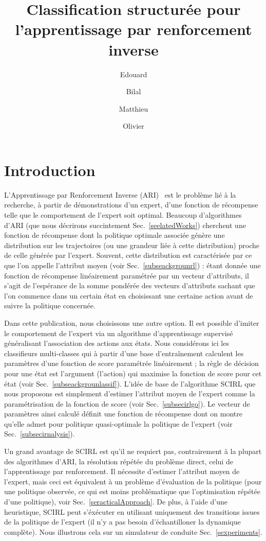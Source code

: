 \documentclass[french,utf8]{./hermes-journal}
\title[SCIRL]{Classification structurée pour l'apprentissage par renforcement inverse}
\author[1,2]{Edouard}{Klein}
\author[2,3]{Bilal}{Piot}
\author[2]{Matthieu}{Geist}
\author[2,3]{Olivier}{Pietquin}
\begin{document}
\maketitle

\newpage
\section{Introduction}
\label{sentro}

L'Apprentissage par Renforcement Inverse (ARI)~\cite{Russel998} est le problème lié à la recherche, à partir de démonstrations d'un expert, d'une fonction de récompense telle que le comportement de l'expert soit optimal. Beaucoup d'algorithmes d'ARI (que nous décrirons succintement Sec.~\ref{seelatedWorks}) cherchent une fonction de récompense dont la politique optimale associée génère une distribution sur les trajectoires (ou une grandeur liée à cette distribution) proche de celle générée par l'expert. Souvent, cette distribution est caractérisée par ce que l'on appelle l'attribut moyen (voir Sec.~\ref{subseackgrounrl}) : étant donnée une fonction de récompense linéairement paramétrée par un vecteur d'attributs, il s'agit de l'espérance de la somme pondérée des vecteurs d'attributs sachant que l'on commence dans un certain état en choisissant une certaine action avant de suivre la politique concernée.

Dans cette publication, nous choisissons une autre option. Il est possible d'imiter le comportement de l'expert via un algorithme d'apprentissage supervisé généralisant l'association des actions aux états. Nous considérons ici les classifieurs multi-classes qui à partir d'une base d'entraînement calculent les paramètres d'une fonction de score paramétrée linéairement ; la règle de décision pour une état est l'argument (l'action) qui maximise la fonction de score pour cet état (voir Sec.~\ref{subseackgrounlassif}). L'idée de base de l'algorithme SCIRL que nous proposons est simplement d'estimer l'attribut moyen de l'expert comme la paramétrisation de la fonction de score (voir Sec.~\ref{subsecirlgo}). Le vecteur de paramètres ainsi calculé définit une fonction de récompense dont on montre qu'elle admet pour politique quasi-optimale la politique de l'expert (voir Sec.~\ref{subsecirnalysis}).

Un grand avantage de SCIRL est qu'il ne requiert pas, contrairement à la plupart des algorithmes d'ARI, la résolution répétée du problème direct, celui de l'apprentissage par renforcement. Il nécessite d'estimer l'attribut moyen de l'expert, mais ceci est équivalent à un problème d'évaluation de la politique (pour une politique observée, ce qui est moins problématique que l'optimisation répétée d'une politique), voir Sec.~\ref{seracticalApproach}.
De plus, à l'aide d'une heuristique, SCIRL peut s'éxécuter en utilisant uniquement des transitions issues de la politique de l'expert (il n'y a pas besoin d'échantilloner la dynamique complète). Nous illustrons cela sur un simulateur de conduite Sec.~\ref{sexperiments}.
\end{document}
